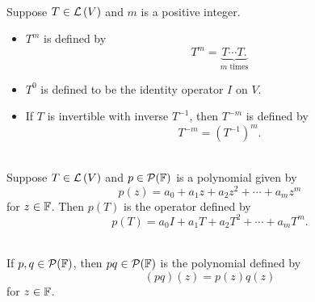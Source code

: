 \\
Suppose $T \in \mathcal{L}\left({V}\right)$ and $m$ is a positive integer.
\begin{itemize}
    \item $T^m$ is defined by 
    $$T^m = \underbrace{T \cdots T.}_{m \text{ times}}$$
    \item $T^0$ is defined to be the identity operator $I$ on $V$.
    \item If $T$ is invertible with inverse $T^{-1}$, then $T^{-m}$ is defined by 
    $$T^{-m} = (T^{-1})^m.$$
\end{itemize}

\\
Suppose $T \in \mathcal{L}\left({V}\right)$ and $p \in \mathcal P (\mathbb{F})$ is a polynomial given by 
$$p(z) = a_0 + a_1z + a_2z^2 + \cdots + a_m z^m$$
for $z \in \mathbb{F}$. Then $p(T)$ is the operator defined by 
$$p(T) = a_0I + a_1T + a_2T^2 + \cdots + a_mT^m.$$

\\ If $p, q \in \mathcal P (\mathbb{F})$, then $pq \in \mathcal P (\mathbb{F})$ is the polynomial defined by
$$(pq)(z) = p(z)q(z)$$
for $z \in \mathbb{F}$.